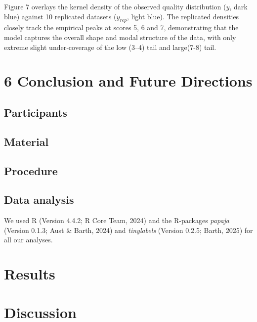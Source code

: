 \documentclass[
  doc,floatsintext]{apa6}
\begin{document}
Figure 7 overlays the kernel density of the observed quality distribution (\(y\), dark blue) against 10 replicated datasets (\(y_{rep}\), light blue). The replicated densities closely track the empirical peaks at scores 5, 6 and 7, demonstrating that the model captures the overall shape and modal structure of the data, with only extreme slight under‐coverage of the low (3--4) tail and large(7-8) tail.

\section{6 Conclusion and Future Directions}\label{conclusion-and-future-directions}

\subsection{}\label{section}

\subsection{Participants}\label{participants}

\subsection{Material}\label{material}

\subsection{Procedure}\label{procedure}

\subsection{Data analysis}\label{data-analysis}

We used R (Version 4.4.2; R Core Team, 2024) and the R-packages \emph{papaja} (Version 0.1.3; Aust \& Barth, 2024) and \emph{tinylabels} (Version 0.2.5; Barth, 2025) for all our analyses.

\section{Results}\label{results}

\section{Discussion}\label{discussion}
\end{document}
